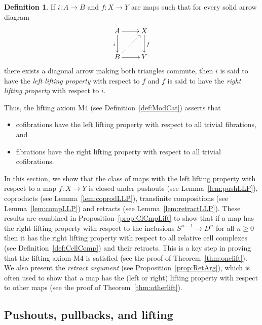 \documentclass[12pt]{amsart}
\numberwithin{equation}{section}
\theoremstyle{slplain}
\theoremstyle{definition}
\newtheorem{defn}[equation]{Definition} %
\theoremstyle{remark}
\newcommand{\thmref}{Theorem~\ref}
\newcommand{\propref}{Proposition~\ref}
\newcommand{\lemref}{Lemma~\ref}
\newcommand{\defref}{Definition~\ref}
\begin{document}
\begin{defn}
  \label{def:LLP}
  If $i\colon A \to B$ and $f\colon X \to Y$ are maps such that for
  every solid arrow diagram
  \begin{displaymath}
    \xymatrix{
      {A} \ar[r] \ar[d]_{i}
      & {X} \ar[d]^{f}\\
      {B} \ar[r] \ar@{..>}[ur]
      & {Y}
    }
  \end{displaymath}
  there exists a diagonal arrow making both triangles commute, then
  $i$ is said to have the \emph{left lifting property} with respect to
  $f$ and $f$ is said to have the \emph{right lifting property} with
  respect to $i$.
\end{defn}

Thus, the lifting axiom M4 (see \defref{def:ModCat}) asserts that
\begin{itemize}
\item cofibrations have the left lifting property with respect to all
  trivial fibrations, and
\item fibrations have the right lifting property with respect to all
  trivial cofibrations.
\end{itemize}
In this section, we show that the class of maps with the left lifting
property with respect to a map $f\colon X \to Y$ is closed under
pushouts (see \lemref{lem:pushLLP}), coproducts (see
\lemref{lem:coprodLLP}), transfinite compositions (see
\lemref{lem:compLLP}) and retracts (see \lemref{lem:retractLLP}).
These results are combined in \propref{prop:ClCmpLift} to show that if
a map has the right lifting property with respect to the inclusions
$S^{n-1} \to D^{n}$ for all $n \ge 0$ then it has the right lifting
property with respect to all relative cell complexes (see
\defref{def:CellComp}) and their retracts.  This is a key step in
proving that the lifting axiom M4 is satisfied (see the proof of
\thmref{thm:onelift}).  We also present the \emph{retract argument}
(see \propref{prop:RetArg}), which is often used to show that a map
has the (left or right) lifting property with respect to other maps
(see the proof of \thmref{thm:otherlift}).

\subsection{Pushouts, pullbacks, and lifting}
\label{sec:PushPullLift}
\end{document}
